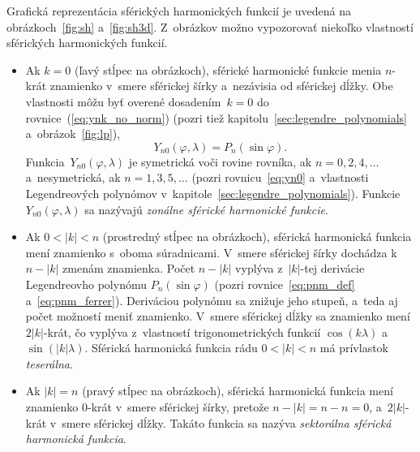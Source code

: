 \documentclass[a4paper, 12pt]{book}
\begin{document}
Grafická reprezentácia sférických harmonických funkcií je uvedená na 
obrázkoch~\ref{fig:sh} a~\ref{fig:sh3d}.  Z~obrázkov možno vypozorovať niekoľko 
vlastností sférických harmonických funkcií.
%
\begin{itemize}
\item Ak $k = 0$ (ľavý stĺpec na obrázkoch), sférické harmonické funkcie menia 
$n$-krát znamienko v~smere sférickej šírky a~nezávisia od sférickej dĺžky.  Obe 
vlastnosti môžu byť overené dosadením~$k = 0$ do rovnice~(\ref{eq:ynk_no_norm}) 
(pozri tiež kapitolu~\ref{sec:legendre_polynomials} a~obrázok~\ref{fig:lp}),
%
\begin{equation}
\label{eq:yn0}
Y_{n0}(\varphi, \lambda) = P_n(\sin\varphi){.}
\end{equation}
%
Funkcia~$Y_{n0}(\varphi, \lambda)$ je symetrická voči rovine rovníka, ak $n 
= 0, 2, 4, \dots$ a~nesymetrická, ak $n = 1, 3, 5, \dots$ (pozri 
rovnicu~\ref{eq:yn0} a~vlastnosti Legendreových polynómov 
v~kapitole~\ref{sec:legendre_polynomials}). Funkcie~$Y_{n0}(\varphi, \lambda)$ 
sa nazývajú \emph{zonálne sférické harmonické funkcie}.

\item Ak $0 < |k| < n$ (prostredný stĺpec na obrázkoch), sférická harmonická 
funkcia mení znamienko s~oboma súradnicami.  V~smere sférickej šírky dochádza 
k~$n - |k|$ zmenám znamienka.  Počet $n - |k|$ vyplýva z~$|k|$-tej derivácie 
Legendreovho polynómu $P_n(\sin\varphi)$ (pozri rovnice~\ref{eq:pnm_def} 
a~\ref{eq:pnm_ferrer}).  Deriváciou polynómu sa znižuje jeho stupeň, a~teda aj 
počet možností meniť znamienko.  V~smere sférickej dĺžky sa znamienko mení 
$2|k|$-krát, čo vyplýva z~vlastností trigonometrických funkcií $\cos(k\lambda)$ 
a~$\sin(|k|\lambda)$.  Sférická harmonická funkcia rádu $0 < |k| < n$ má 
prívlastok \emph{teserálna}.

\item Ak $|k| = n$ (pravý stĺpec na obrázkoch), sférická harmonická funkcia 
mení znamienko $0$-krát v~smere sférickej šírky, pretože $n - |k| = n - n = 0$, 
a~$2|k|$-krát v~smere sférickej dĺžky.  Takáto funkcia sa nazýva 
\emph{sektorálna sférická harmonická funkcia}.
\end{itemize}
\end{document}
